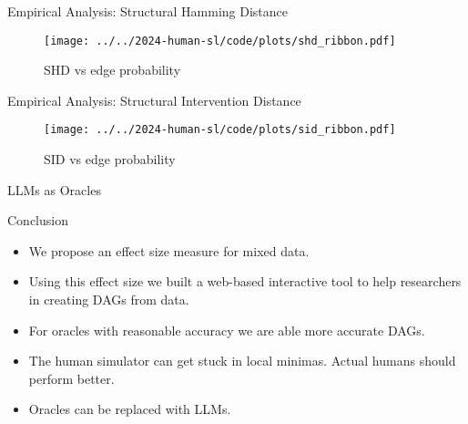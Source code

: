 \documentclass{beamer}
\begin{document}
\begin{frame}{Empirical Analysis: Structural Hamming Distance}
	\begin{figure}
		\centering
		\texttt{[image: ../../2024-human-sl/code/plots/shd\_ribbon.pdf]}
		\caption{SHD vs edge probability}
	\end{figure}
\end{frame}

\begin{frame}{Empirical Analysis: Structural Intervention Distance}
	\begin{figure}
		\centering
		\texttt{[image: ../../2024-human-sl/code/plots/sid\_ribbon.pdf]}
		\caption{SID vs edge probability}
	\end{figure}
\end{frame}

\begin{frame}{LLMs as Oracles}
\end{frame}

\begin{frame}{Conclusion}
	\begin{itemize}
		\item We propose an effect size measure for mixed data.
		\item Using this effect size we built a web-based interactive tool to help researchers in creating DAGs from data.
		\item For oracles with reasonable accuracy we are able more accurate DAGs.
		\item The human simulator can get stuck in local minimas. Actual humans should perform better.
		\item Oracles can be replaced with LLMs.
	\end{itemize}
\end{frame}
\end{document}
